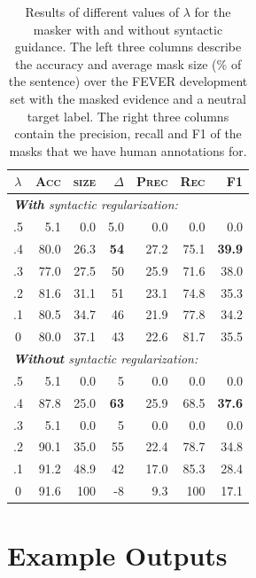 \documentclass[letterpaper]{article} %
\begin{document}
\begin{table}[t]
\centering
\begin{tabular}{c|rrr|rrr}
\toprule
${\lambda}$ & \textsc{Acc} & \textsc{size} & $\Delta$ & \textsc{Prec} & \textsc{Rec} & \textsc{F1}   \\ \midrule
\multicolumn{7}{l}{\textit{\textbf{With} syntactic regularization:}}\\
.5 & 5.1      & 0.0         & 5.0   & 0.0    & 0.0      & 0.0    \\ 
.4 & 80.0       & 26.3      & \textbf{54}  & 27.2 & 75.1   & \textbf{39.9} \\ 
.3 & 77.0       & 27.5      & 50  & 25.9 & 71.6   & 38.0   \\ 
.2 & 81.6     & 31.1      & 51  & 23.1 & 74.8   & 35.3 \\ 
.1 & 80.5     & 34.7      & 46  & 21.9 & 77.8   & 34.2 \\ 
0   & 80.0       & 37.1      & 43  & 22.6 & 81.7   & 35.5 \\ 
\midrule
\multicolumn{7}{l}{\textit{\textbf{Without} syntactic regularization:}}\\
.5 & 5.1      & 0.0         & 5   & 0.0    & 0.0      & 0.0    \\ 
.4 & 87.8      & 25.0        & \textbf{63}   & 25.9    & 68.5      & \textbf{37.6}    \\ 
.3 & 5.1      & 0.0         & 5   & 0.0    & 0.0      & 0.0    \\ 
.2 & 90.1      & 35.0         & 55   & 22.4    & 78.7      & 34.8    \\ 
.1 & 91.2      & 48.9         & 42   & 17.0    & 85.3      & 28.4    \\ 
0   & 91.6      & 100      & -8  & 9.3 & 100   & 17.1 \\ 
\bottomrule
\end{tabular}
\caption{Results of different values of $\lambda$ for the masker with and without syntactic guidance. The left three columns describe the accuracy and average mask size (\% of the sentence) over the FEVER development set with the masked evidence and a neutral target label. The right three columns contain the precision, recall and F1 of the masks that we have human annotations for.}
\label{tab:mask_res_more}
\end{table}


\section{Example Outputs}
\end{document}
